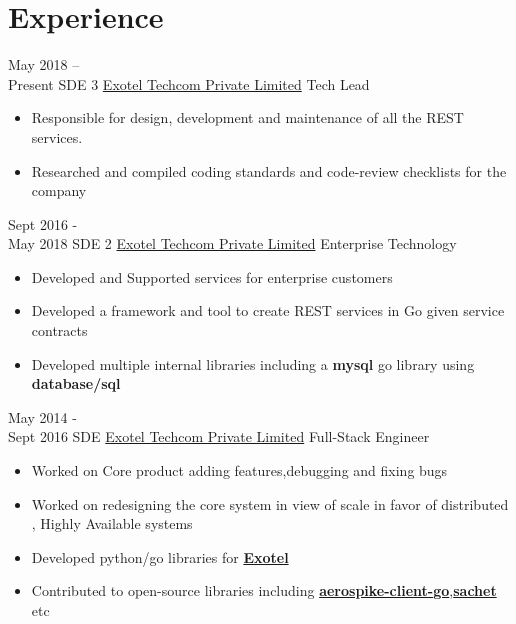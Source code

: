 \documentclass[letterpaper]{twentysecondcv} %
\begin{document}
\makeprofile %

\section{Experience}
\begin{twenty} %
	\twentyitem
    	{May 2018 -- \\Present}
        {SDE 3}
        {\href{http://exotel.com/}{Exotel Techcom Private Limited}}
        {Tech Lead}
        {
        {\begin{itemize}
        \item Responsible for design, development and maintenance of all the REST services.
        \item Researched and compiled coding standards and code-review checklists for the company  
    	\end{itemize}}
        }
        
    \twentyitem
   		{Sept 2016 - \\ May 2018}
        {SDE 2}
        {\href{http://exotel.com/}{Exotel Techcom Private Limited}}
        {Enterprise Technology}
        {
        {\begin{itemize}
        \item Developed and Supported services for enterprise customers  
        \item Developed a framework and tool to create REST services in Go given service contracts 
        \item Developed multiple internal libraries including a \textbf{mysql} go library using \textbf{database/sql}
    	\end{itemize}}
        }
        
     \twentyitem
   		{May 2014 - \\ Sept  2016}
        {SDE}
        {\href{http://exotel.com/}{Exotel Techcom Private Limited}}
        {Full-Stack Engineer}
        {
        \begin{itemize}
        	\item Worked on Core product adding features,debugging and fixing bugs
            \item Worked on redesigning the core system in view of scale in favor of distributed , Highly Available systems
            \item Developed python/go libraries for {\href{https://github.com/sarathsp06/exotel-py}\textbf{Exotel}}
            \item Contributed to open-source libraries including {\href{https://github.com/aerospike/aerospike-client-go}{\textbf{aerospike-client-go}}},{\href{https://github.com/messagebird/sachet}{\textbf{sachet}}} etc  
    	\end{itemize}
    	}
        

\end{twenty}
\end{document}
